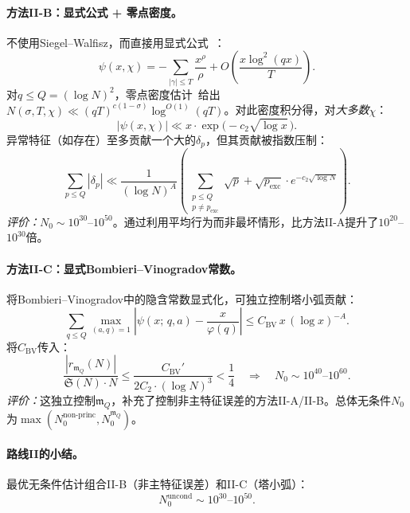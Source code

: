 \documentclass[11pt,a4paper]{article}
\theoremstyle{remark}
\newcommand{\mm}{\mathfrak{m}}
\begin{document}
\paragraph{方法II-B：显式公式 + 零点密度。}
不使用Siegel--Walfisz，而直接用显式公式~\cite[第12章]{Davenport2000}：
\begin{equation}
\label{eq:explicit-formula}
  \psi(x,\chi) = -\sum_{|\gamma| \leq T}\frac{x^{\rho}}{\rho}
    + O\!\left(\frac{x\log^2(qx)}{T}\right).
\end{equation}
对$q \leq Q = (\log N)^2$，零点密度估计~\cite[第16章]{IwaniecKowalski2004}给出$N(\sigma, T, \chi) \ll (qT)^{c(1-\sigma)}\log^{O(1)}(qT)$。对此密度积分得，对\emph{大多数}$\chi$：
\begin{equation}
\label{eq:methodB-bound}
  |\psi(x,\chi)| \ll x \cdot \exp\!\bigl(-c_2\sqrt{\log x}\,\bigr).
\end{equation}
异常特征（如存在）至多贡献一个大的$\delta_p$，但其贡献被指数压制：
\begin{equation}
\label{eq:methodB-sum}
  \sum_{p \leq Q}|\delta_p|
    \ll \frac{1}{(\log N)^A}\left(\sum_{\substack{p \leq Q \\ p \neq p_{\text{exc}}}}\sqrt{p}
    + \sqrt{p_{\text{exc}}}\cdot e^{-c_2\sqrt{\log N}}\right).
\end{equation}
\emph{评价：}$N_0 \sim 10^{30}$--$10^{50}$。通过利用平均行为而非最坏情形，比方法II-A提升了$10^{20}$--$10^{30}$倍。

\paragraph{方法II-C：显式Bombieri--Vinogradov常数。}
将Bombieri--Vinogradov中的隐含常数显式化，可独立控制塔小弧贡献：
\begin{equation}
\label{eq:explicit-bv}
  \sum_{q \leq Q}\max_{(a,q)=1}\left|\psi(x;\,q,a) - \frac{x}{\varphi(q)}\right|
    \leq C_{\text{BV}}\, x\, (\log x)^{-A}.
\end{equation}
将$C_{\text{BV}}$传入：
\begin{equation}
\label{eq:methodC-N0}
  \frac{|r_{\mm_Q}(N)|}{\mathfrak{S}(N)\cdot N}
    \leq \frac{C_{\text{BV}}'}{2C_2\cdot(\log N)^3} < \frac{1}{4}
  \quad\Longrightarrow\quad N_0 \sim 10^{40}\text{--}10^{60}.
\end{equation}
\emph{评价：}这独立控制$\mm_Q$，补充了控制非主特征误差的方法II-A/II-B。总体无条件$N_0$为$\max(N_0^{\text{non-princ}}, N_0^{\mm_Q})$。

\paragraph{路线II的小结。}
最优无条件估计组合II-B（非主特征误差）和II-C（塔小弧）：
\begin{equation}
\label{eq:routeII-N0}
  N_0^{\text{uncond}} \sim 10^{30}\text{--}10^{50}.
\end{equation}
\end{document}
